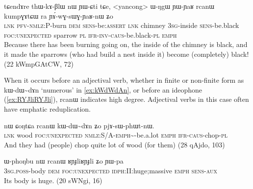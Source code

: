 \documentclass[oldfontcommands,oneside,a4paper,11pt]{article}
\newcommand{\ipa}[1]{{\phon #1}} %
\begin{document}

\begin{exe}
\ex \label{ex:YAwGsWGYaRnW}
\gll 
\ipa{tɕendɤre} 	\ipa{thɯ-kɤ-βlɯ} 	\ipa{nɯ} 	\ipa{ɲɯ-ɕti} 	\ipa{tɕe,} 	<yancong>	 \ipa{ɯ-ŋgɯ} 	\ipa{ɲɯ-ɲaʁ} 	\ipa{rcanɯ} 	\ipa{kumpɣɤtɕɯ} 	\ipa{ra} 	\ipa{ɲɤ́-wɣ-sɯɣ-ɲaʁ-nɯ} 	\ipa{ʑo} 	\\
\textsc{lnk} \textsc{pfv-nmlz}:P-burn \textsc{dem} \textsc{sens}-be:\textsc{assert} \textsc{lnk} chimney \textsc{3sg}-inside \textsc{sens}-be.black \textsc{foc:unexpected} sparrow \textsc{pl} \textsc{ifr-inv-caus}-be.black-\textsc{pl} \textsc{emph} \\
\glt Because there has been burning going on, the inside of the chimney is black, and it made the sparrows (who had build a nest inside it) become (completely) black! (22 kWmpGAtCW, 72)
\end{exe}
When it occurs before an adjectival verb, whether in finite or non-finite form as \ipa{kɯ-dɯ\textasciitilde{}dɤn} `numerous' in \ref{ex:kWdWdAn}, or before an ideophone (\ref{ex:RYJliRYJli}), \ipa{rcanɯ} indicates high degree. Adjectival verbs in this case often have emphatic reduplication.

\begin{exe}
\ex \label{ex:kWdWdAn}
\gll \ipa{tɕe} 	\ipa{nɯ} 	\ipa{ɕoŋtɕa} 	\ipa{rcanɯ} 	\ipa{kɯ-dɯ\textasciitilde{}dɤn} 	\ipa{ʑo} 	\ipa{pjɤ-sɯ-phɯt-nɯ.} \\
\textsc{lnk} wood \textsc{foc:unexpected} \textsc{nmlz}:S/A-\textsc{emph}\textasciitilde{}-be.a.lot \textsc{emph} \textsc{ifr-caus}-chop-\textsc{pl}\\
\glt And they had (people) chop quite lot of wood (for them) (28 qAjdo,  103)
\end{exe}
\begin{exe}
\ex \label{ex:RYJliRYJli}
\gll
\ipa{ɯ-phoŋbu} 	\ipa{nɯ} 	\ipa{rcanɯ} 	\ipa{ʁɲɟliʁɲɟli} 	\ipa{ʑo} 	\ipa{ɲɯ-pa} \\
\textsc{3sg.poss}-body \textsc{dem}  \textsc{foc:unexpected} \textsc{idph}:II:huge;massive \textsc{emph} \textsc{sens}-\textsc{aux} \\
\glt Its body is huge. (20 sWNgi,  16)
\end{exe}
\end{document}

